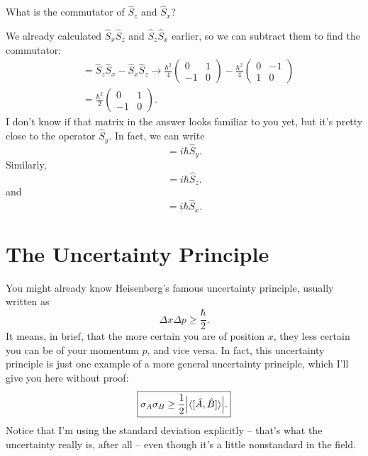 \begin{example}[Commutators]

What is the commutator of $\hat{S}_z$ and $\hat{S}_x$?

We already calculated $\hat{S}_x\hat{S}_z$ and $\hat{S}_z\hat{S}_x$ earlier, so we can subtract them to find the commutator:
\begin{align*}
[\hat{S}_z, \hat{S}_x] & = \hat{S}_z \hat{S}_x - \hat{S}_x \hat{S}_z \to \frac{\hbar^2}{4} \begin{pmatrix} 0 & 1 \\ -1 & 0 \end{pmatrix} - \frac{\hbar^2}{4} \begin{pmatrix} 0 & -1 \\ 1 & 0 \end{pmatrix} \\
& = \frac{\hbar^2}{2} \begin{pmatrix} 0 & 1 \\ -1 & 0 \end{pmatrix}.
\end{align*}
I don't know if that matrix in the answer looks familiar to you yet, but it's pretty close to the operator $\hat{S}_y$.  In fact, we can write 
\begin{equation}
[\hat{S}_z, \hat{S}_x] = i \hbar \hat{S}_y.
\end{equation}
Similarly,
\begin{equation}
[\hat{S}_x, \hat{S}_y] = i \hbar \hat{S}_z.
\end{equation}
and
\begin{equation}
[\hat{S}_y, \hat{S}_z] = i \hbar \hat{S}_x.
\end{equation}

\end{example}


\section{The Uncertainty Principle}

You might already know Heisenberg's famous uncertainty principle, usually written as
\[
\Delta x \Delta p \ge \frac{\hbar}{2}.
\]
It means, in brief, that the more certain you are of position $x$, they less certain you can be of your momentum $p$, and vice versa.  In fact, this uncertainty principle is just one example of a more general uncertainty principle, which I'll give you here without proof:
\begin{equation}
\label{eq_uncertainty}
\boxed{
\sigma_A \sigma_B \ge \frac{1}{2} \Big| \langle  [\hat{A}, \hat{B}] \rangle \Big|.
}
\end{equation}
Notice that I'm using the standard deviation explicitly -- that's what the uncertainty really is, after all -- even though it's a little nonstandard in the field.

